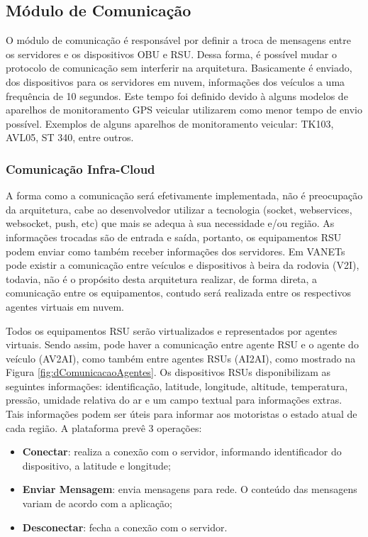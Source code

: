 \documentclass[
	12pt,				%
	oneside,			%
	a4paper,			%
	english,			%
	brazil				%
	]{abntex2ppgsi}
\begin{document}
\subsection{Módulo de Comunicação}

O módulo de comunicação é responsável por definir a troca de mensagens entre os servidores e os dispositivos  OBU e RSU. Dessa forma, é possível mudar o protocolo de comunicação sem interferir na arquitetura. Basicamente é enviado, dos dispositivos para os servidores em nuvem, informações dos veículos a uma frequência de 10 segundos. Este tempo foi definido devido à alguns modelos de aparelhos de monitoramento GPS veicular utilizarem como menor tempo de envio possível. Exemplos de alguns aparelhos de monitoramento veicular: TK103, AVL05, ST 340, entre outros.

\subsubsection{Comunicação Infra-Cloud}

A forma como a comunicação será efetivamente implementada, não é preocupação da arquitetura, cabe ao desenvolvedor utilizar a tecnologia (socket, webservices, websocket, push, etc) que mais se adequa à sua necessidade e/ou região. As informações trocadas são de entrada e saída, portanto, os equipamentos RSU podem enviar como também receber informações dos servidores. Em VANETs pode existir a comunicação entre veículos e dispositivos à beira da rodovia (V2I), todavia, não é o propósito desta arquitetura realizar, de forma direta, a comunicação entre os equipamentos, contudo será realizada entre os respectivos agentes virtuais em nuvem. 

Todos os equipamentos RSU serão virtualizados e representados por agentes virtuais. Sendo assim, pode haver a comunicação entre agente RSU e o agente do veículo (AV2AI), como também entre agentes RSUs (AI2AI), como mostrado na Figura \ref{fig:dComunicacaoAgentes}. Os dispositivos RSUs disponibilizam as seguintes informações: identificação, latitude, longitude, altitude, temperatura, pressão, umidade relativa do ar e um campo textual para informações extras. Tais informações podem ser úteis para informar aos motoristas o estado atual de cada região. A plataforma prevê  3 operações:

\begin{itemize}
	\item{\textbf{Conectar}: realiza a conexão com o servidor, informando identificador do dispositivo, a latitude e longitude;}	
	\item{\textbf{Enviar Mensagem}: envia mensagens para rede. O conteúdo das mensagens variam de acordo com a aplicação;}	
	\item{\textbf{Desconectar}: fecha a conexão com o servidor.}	
\end{itemize} 
\end{document}
